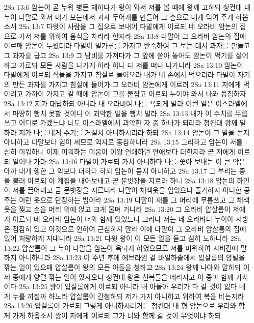 2Sa 13:6  암논이 곧 누워 병든 체하다가 왕이 와서 저를 볼 때에 왕께 고하되 청컨대 내 누이 다말로 와서 내가 보는데서 과자 두어개를 만들어 그 손으로 내게 먹여 주게 하옵소서
2Sa 13:7  다윗이 사람을 그 집으로 보내어 다말에게 이르되 네 오라비 암논의 집으로 가서 저를 위하여 음식을 차리라 한지라
2Sa 13:8  다말이 그 오라비 암논의 집에 이르매 암논이 누웠더라 다말이 밀가루를 가지고 반죽하여 그 보는 데서 과자를 만들고 그 과자를 굽고
2Sa 13:9  그 남비를 가져다가 그 앞에 쏟아 놓아도 암논이 먹기를 싫어하고 가로되 모든 사람을 나가게 하라 하니 다 저를 떠나 나가니라
2Sa 13:10  암논이 다말에게 이르되 식물을 가지고 침실로 들어오라 내가 네 손에서 먹으리라 다말이 자기의 만든 과자를 가지고 침실에 들어가 그 오라비 암논에게 이르러
2Sa 13:11  저에게 먹이려고 가까이 가지고 갈 때에 암논이 그를 붙잡고 이르되 누이야 와서 나와 동침하자
2Sa 13:12  저가 대답하되 아니라 내 오라비여 나를 욕되게 말라 이런 일은 이스라엘에서 마땅히 행치 못할 것이니 이 괴악한 일을 행치 말라
2Sa 13:13  내가 이 수치를 무릅쓰고 어디로 가겠느냐 너도 이스라엘에서 괴악한 자 중 하나가 되리라 청컨대 왕께 말하라 저가 나를 네게 주기를 거절치 아니하시리라 하되
2Sa 13:14  암논이 그 말을 듣지 아니하고 다말보다 힘이 세므로 억지로 동침하니라
2Sa 13:15  그리하고 암논이 저를 심히 미워하니 이제 미워하는 미움이 이왕 연애하던 연애보다 더한지라 곧 저에게 이르되 일어나 가라
2Sa 13:16  다말이 가로되 가치 아니하다 나를 쫓아 보내는 이 큰 악은 아까 내게 행한 그 악보다 더하다 하되 암논이 듣지 아니하고
2Sa 13:17  그 부리는 종을 불러 이르되 이 계집을 내어보내고 곧 문빗장을 지르라 하니
2Sa 13:18  암논의 하인이 저를 끌어내고 곧 문빗장을 지르니라 다말이 채색옷을 입었으니 출가하지 아니한 공주는 이런 옷으로 단장하는 법이라
2Sa 13:19  다말이 재를 그 머리에 무릅쓰고 그 채색옷을 찢고 손을 머리 위에 얹고 크게 울며 가니라
2Sa 13:20  그 오라비 압살롬이 저에게 이르되 네 오라비 암논이 너와 함께 있었느냐 그러나 저는 네 오라비니 누이야 시방은 잠잠히 있고 이것으로 인하여 근심하지 말라 이에 다말이 그 오라비 압살롬의 집에 있어 처량하게 지내니라
2Sa 13:21  다윗 왕이 이 모든 일을 듣고 심히 노하니라
2Sa 13:22  압살롬이 그 누이 다말을 암논이 욕되게 하였으므로 저를 미워하여 시비간에 말하지 아니하니라
2Sa 13:23  이 주년 후에 에브라임 곁 바알하솔에서 압살롬의 양털을 깎는 일이 있으매 압살롬이 왕의 모든 아들을 청하고
2Sa 13:24  왕께 나아와 말하되 이제 종에게 양털 깎는 일이 있사오니 청컨대 왕은 신복들을 데리시고 이 종과 함께 가사이다
2Sa 13:25  왕이 압살롬에게 이르되 아니라 내 아들아 우리가 다 갈 것이 없다 네게 누를 끼칠까 하노라 압살롬이 간청하되 저가 가지 아니하고 위하여 복을 비는지라
2Sa 13:26  압살롬이 가로되 그렇게 아니하시려거든 청컨대 내 형 암논으로 우리와 함께 가게 하옵소서 왕이 저에게 이르되 그가 너와 함께 갈 것이 무엇이냐 하되
